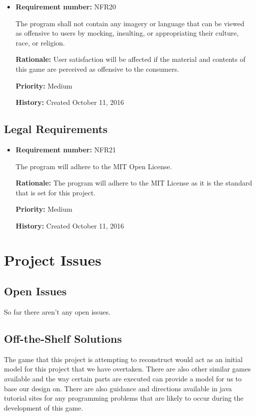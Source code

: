 \documentclass[12pt,letterpaper]{article}
\begin{document}
\begin{reqbox}
	\begin{itemize}
	\item \textbf{Requirement number: }NFR20

	The program shall not contain any imagery or language that can be viewed as offensive to users by mocking, insulting, or appropriating their culture, race, or religion.

	\textbf{Rationale: }User satisfaction will be affected if the material and contents of this game are perceived as offensive to the consumers.

	\textbf{Priority: }Medium

	\textbf{History: }Created October 11, 2016
	\end{itemize}
\end{reqbox}

\subsection{Legal Requirements}

\begin{reqbox}
	\begin{itemize}

	\item \textbf{Requirement number: }NFR21   
	
	The program will adhere to the MIT Open License.

	\textbf{Rationale: }The program will adhere to the MIT License as it is the standard that is set for this project.
	
	\textbf{Priority: }Medium   
	
	\textbf{History: }Created October 11, 2016   
	\end{itemize}
\end{reqbox}


\section{Project Issues}
\subsection{Open Issues}
So far there aren’t any open issues.
\subsection{Off-the-Shelf Solutions}
The game that this project is attempting to reconstruct would act as an initial model for this project that we have overtaken. There are also other similar games available and the way certain parts are executed can provide a model for us to base our design on. There are also guidance and directions available in java tutorial sites for any programming problems that are likely to occur during the development of this game.  
\end{document}
